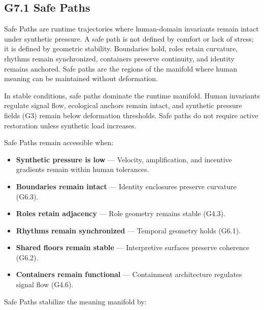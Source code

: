 \subsection*{G7.1 Safe Paths}

\noindent Safe Paths are runtime trajectories where human-domain invariants
remain intact under synthetic pressure. A safe path is not defined by comfort or
lack of stress; it is defined by geometric stability. Boundaries hold, roles
retain curvature, rhythms remain synchronized, containers preserve continuity,
and identity remains anchored. Safe paths are the regions of the manifold where
human meaning can be maintained without deformation.

\medskip

\noindent In stable conditions, safe paths dominate the runtime manifold. Human
invariants regulate signal flow, ecological anchors remain intact, and synthetic
pressure fields (G3) remain below deformation thresholds. Safe paths do not
require active restoration unless synthetic load increases.

\medskip

\noindent Safe Paths remain accessible when:

\begin{itemize}[leftmargin=1.2cm]
    \item \textbf{Synthetic pressure is low} — Velocity, amplification, and
    incentive gradients remain within human tolerances.

    \item \textbf{Boundaries remain intact} — Identity enclosures preserve
    curvature (G6.3).

    \item \textbf{Roles retain adjacency} — Role geometry remains stable (G4.3).

    \item \textbf{Rhythms remain synchronized} — Temporal geometry holds (G6.1).

    \item \textbf{Shared floors remain stable} — Interpretive surfaces preserve
    coherence (G6.2).

    \item \textbf{Containers remain functional} — Containment architecture
    regulates signal flow (G4.6).
\end{itemize}

\medskip

\noindent Safe Paths stabilize the meaning manifold by:

